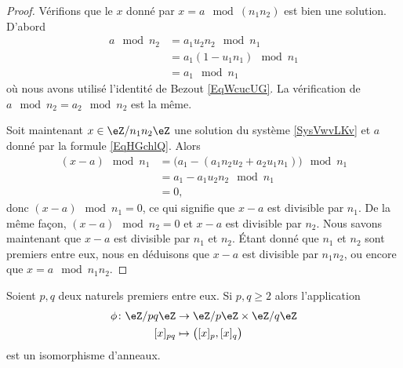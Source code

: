 \begin{proof}
    Vérifions que le \( x\) donné par \(x=a\mod(n_1n_2)\) est bien une solution. D'abord
    \begin{subequations}
        \begin{align}
            a\mod n_2&=a_1u_2n_2\mod n_1\\
            &=a_1(1-u_1n_1)\mod n_1\\
            &=a_1\mod n_1
        \end{align}
    \end{subequations}
    où nous avons utilisé l'identité de Bezout \eqref{EqWcucUG}. La vérification de \( a\mod n_2=a_2\mod n_2\) est la même.

    Soit maintenant \( x\in \eZ/n_1n_2\eZ\) une solution du système \eqref{SysVwvLKv} et \( a\) donné par la formule \eqref{EqHGchlQ}. Alors
    \begin{subequations}
        \begin{align}
            (x-a)\mod n_1&=\Big( a_1-(a_1n_2u_2+a_2u_1n_1) \Big)\mod n_1\\
            &=a_1-a_1u_2n_2\mod n_1\\
            &=0,
        \end{align}
    \end{subequations}
    donc \( (x-a)\mod n_1=0\), ce qui signifie que \( x-a\) est divisible par \( n_1\). De la même façon, \( (x-a)\mod n_2=0\) et \( x-a\) est divisible par \( n_2\). Nous savons maintenant que \( x-a\) est divisible par \( n_1\) et \( n_2\). Étant donné que \( n_1\) et \( n_2\) sont premiers entre eux, nous en déduisons que \( x-a\) est divisible par \( n_1n_2\), ou encore que \( x=a\mod n_1n_2\).
\end{proof}

\begin{theorem}
    Soient \( p,q\) deux naturels premiers entre eux. Si \( p,q\geq 2\) alors l'application
    \begin{equation}
        \begin{aligned}
            \phi\colon \eZ/pq\eZ&\to \eZ/p\eZ\times \eZ/q\eZ \\
            [x]_{pq}&\mapsto \big( [x]_p,[x]_q \big) 
        \end{aligned}
    \end{equation}
    est un isomorphisme d'anneaux.
\end{theorem}


